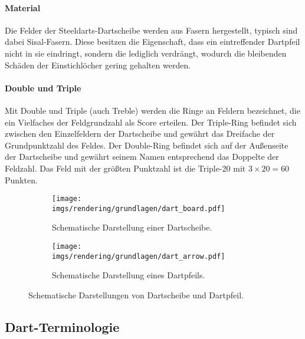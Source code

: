 \paragraph{Material}

Die Felder der Steeldarts-Dartscheibe werden aus Fasern hergestellt, typisch sind dabei Sisal-Fasern. Diese besitzen die Eigenschaft, dass ein eintreffender Dartpfeil nicht in sie eindringt, sondern die lediglich verdrängt, wodurch die bleibenden Schäden der Einstichlöcher gering gehalten werden.

\paragraph{Double und Triple}

Mit Double und Triple (auch Treble) werden die Ringe an Feldern bezeichnet, die ein Vielfaches der Feldgrundzahl als Score erteilen. Der Triple-Ring befindet sich zwischen den Einzelfeldern der Dartscheibe und gewährt das Dreifache der Grundpunktzahl des Feldes. Der Double-Ring befindet sich auf der Außenseite der Dartscheibe und gewährt seinem Namen entsprechend das Doppelte der Feldzahl. Das Feld mit der größten Punktzahl ist die Triple-20 mit $3 \times 20 = 60$ Punkten.

\begin{figure}
    \begin{subfigure}{\textwidth}
        \centering
        \texttt{[image: imgs/rendering/grundlagen/dart\_board.pdf]}
        \caption{Schematische Darstellung einer Dartscheibe.}
        \label{img:dart_board}
    \end{subfigure}
    \par
    \vspace*{0.5cm}
    \begin{subfigure}{\textwidth}
        \centering
        \texttt{[image: imgs/rendering/grundlagen/dart\_arrow.pdf]}
        \caption{Schematische Darstellung eines Dartpfeils.}
        \label{img:dart_arrow}
    \end{subfigure}
    \caption{Schematische Darstellungen von Dartscheibe und Dartpfeil.}
    \label{img:dart_board_and_arrow}
\end{figure}



\subsection{Dart-Terminologie}
\label{sec:dart_terminologie}

